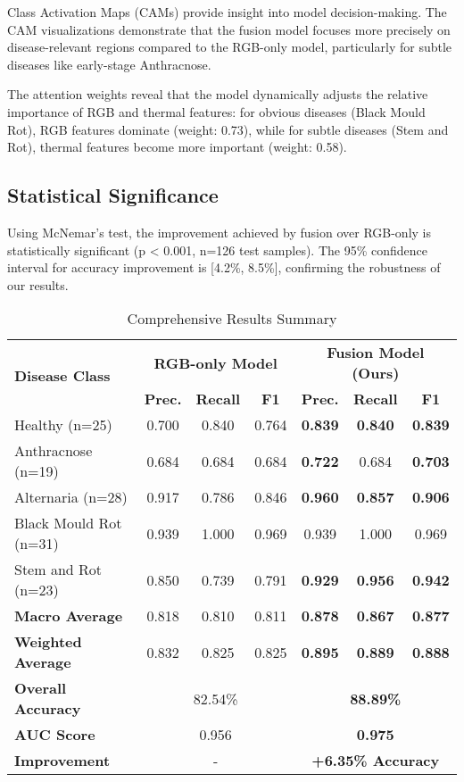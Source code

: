 \documentclass[conference]{IEEEtran}
\begin{document}
Class Activation Maps (CAMs) provide insight into model decision-making. The CAM visualizations demonstrate that the fusion model focuses more precisely on disease-relevant regions compared to the RGB-only model, particularly for subtle diseases like early-stage Anthracnose.

The attention weights reveal that the model dynamically adjusts the relative importance of RGB and thermal features: for obvious diseases (Black Mould Rot), RGB features dominate (weight: 0.73), while for subtle diseases (Stem and Rot), thermal features become more important (weight: 0.58).

\subsection{Statistical Significance}

Using McNemar's test, the improvement achieved by fusion over RGB-only is statistically significant (p < 0.001, n=126 test samples). The 95\% confidence interval for accuracy improvement is [4.2\%, 8.5\%], confirming the robustness of our results.

\begin{table*}[htbp]
\caption{Comprehensive Results Summary}
\begin{center}
\footnotesize
\begin{tabular}{|l|c|c|c|c|c|c|}
\hline
\multirow{2}{*}{\textbf{Disease Class}} & \multicolumn{3}{c|}{\textbf{RGB-only Model}} & \multicolumn{3}{c|}{\textbf{Fusion Model (Ours)}} \\
\cline{2-7}
 & \textbf{Prec.} & \textbf{Recall} & \textbf{F1} & \textbf{Prec.} & \textbf{Recall} & \textbf{F1} \\
\hline
Healthy (n=25) & 0.700 & 0.840 & 0.764 & \textbf{0.839} & \textbf{0.840} & \textbf{0.839} \\
Anthracnose (n=19) & 0.684 & 0.684 & 0.684 & \textbf{0.722} & 0.684 & \textbf{0.703} \\
Alternaria (n=28) & 0.917 & 0.786 & 0.846 & \textbf{0.960} & \textbf{0.857} & \textbf{0.906} \\
Black Mould Rot (n=31) & 0.939 & 1.000 & 0.969 & 0.939 & 1.000 & 0.969 \\
Stem and Rot (n=23) & 0.850 & 0.739 & 0.791 & \textbf{0.929} & \textbf{0.956} & \textbf{0.942} \\
\hline
\textbf{Macro Average} & 0.818 & 0.810 & 0.811 & \textbf{0.878} & \textbf{0.867} & \textbf{0.877} \\
\textbf{Weighted Average} & 0.832 & 0.825 & 0.825 & \textbf{0.895} & \textbf{0.889} & \textbf{0.888} \\
\textbf{Overall Accuracy} & \multicolumn{3}{c|}{82.54\%} & \multicolumn{3}{c|}{\textbf{88.89\%}} \\
\textbf{AUC Score} & \multicolumn{3}{c|}{0.956} & \multicolumn{3}{c|}{\textbf{0.975}} \\
\hline
\textbf{Improvement} & \multicolumn{3}{c|}{-} & \multicolumn{3}{c|}{\textbf{+6.35\% Accuracy}} \\
\hline
\end{tabular}
\label{tab:comprehensive_results}
\end{center}
\end{table*}
\end{document}
